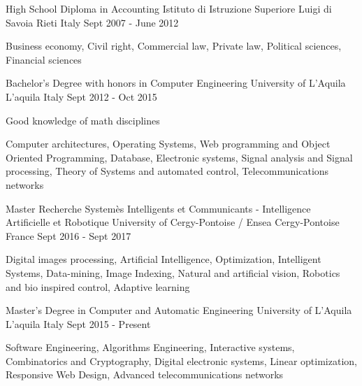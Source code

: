 


\begin{cventries}


\cventry
{High School Diploma in Accounting} %
{Istituto di Istruzione Superiore Luigi di Savoia} %
{Rieti Italy} %
{Sept 2007 - June 2012} %
{ %
	\begin{cvitems}
		\item {Business economy, Civil right, Commercial law, Private law, Political sciences, Financial sciences}
	\end{cvitems}
}

\cventry
{Bachelor’s Degree with honors in Computer Engineering} %
{University of L'Aquila} %
{L'aquila Italy} %
{Sept 2012 - Oct 2015} %
{ %
	\begin{cvitems}
		\item {Good knowledge of math disciplines}
		\item {Computer architectures, Operating Systems, Web programming and Object Oriented Programming, Database, Electronic systems, Signal analysis and Signal processing, Theory of Systems and automated control, Telecommunications networks}
	\end{cvitems}
}

\cventry
{Master Recherche Systemès Intelligents et Communicants - Intelligence Artificielle et Robotique} %
{University of Cergy-Pontoise / Ensea} %
{Cergy-Pontoise France} %
{Sept 2016 - Sept 2017} %
{ %
	\begin{cvitems}
		\item {Digital images processing, Artificial Intelligence, Optimization, Intelligent Systems, Data-mining, Image Indexing, Natural and artificial vision, Robotics and bio inspired control, Adaptive learning}
	\end{cvitems}
}

\cventry
{Master’s Degree in Computer and Automatic Engineering} %
{University of L'Aquila} %
{L'aquila Italy} %
{Sept 2015 - Present} %
{ %
	\begin{cvitems}
		\item {Software Engineering, Algorithms Engineering, Interactive systems,  Combinatorics and Cryptography, Digital electronic systems, Linear optimization, Responsive Web Design, Advanced telecommunications networks}
	\end{cvitems}
}

\end{cventries}